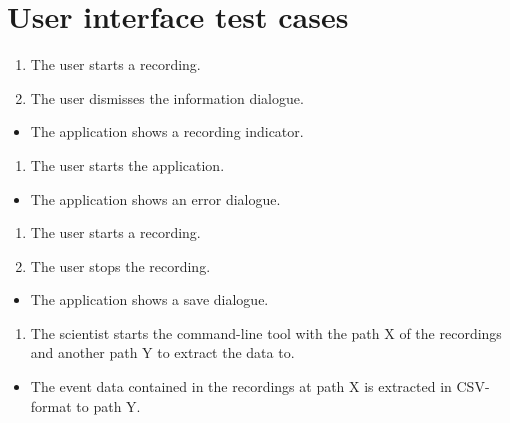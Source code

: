 \section{User interface test cases}

\begin{tests}
    {\begin{enumerate}
        \item The \gls{user} starts a recording.
        \item The \gls{user} dismisses the information dialogue.
    \end{enumerate}}
    {\begin{itemize}
        \item The application shows a recording indicator.
    \end{itemize}}

    {\begin{enumerate}
        \item The \gls{user} starts the application.
    \end{enumerate}}
    {\begin{itemize}
        \item The application shows an error dialogue.
    \end{itemize}}

    {\begin{enumerate}
        \item The \gls{user} starts a recording.
        \item The \gls{user} stops the recording.
    \end{enumerate}}
    {\begin{itemize}
        \item The application shows a save dialogue.
    \end{itemize}}

    {\begin{enumerate}
        \item The \gls{scientist} starts the command-line tool with the path X of the recordings and another path Y to extract the data to.
    \end{enumerate}}
    {\begin{itemize}
        \item The event data contained in the recordings at path X is extracted in CSV-format to path Y.
    \end{itemize}}


\end{tests}
